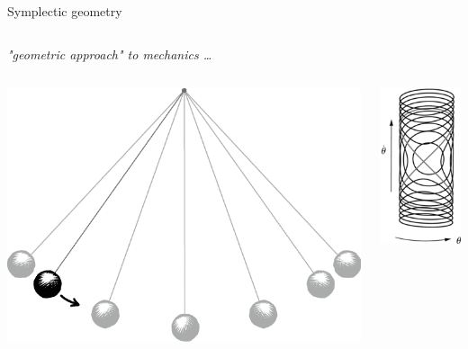 \documentclass[handout,10pt]{beamer}
\begin{document}
\begin{frame}{Symplectic geometry}
\begin{columns}[T]
	\begin{column}{.50\linewidth}
		\centering
		\textit{ "geometric approach" to mechanics \dots}
		\begin{columns}
			\begin{column}{.50\linewidth}
				\begin{center}
					\includegraphics[width=0.8\linewidth]{../Pictures/pendulum13}			
				\end{center}
			\end{column}	
			\begin{column}{.50\linewidth}
				\begin{center}
					\includegraphics[width=0.45\linewidth]{../Pictures/pendulum-phase-space}			

\end{center}
\end{column}
\end{columns}
\end{column}
\end{columns}
\end{frame}
\end{document}
